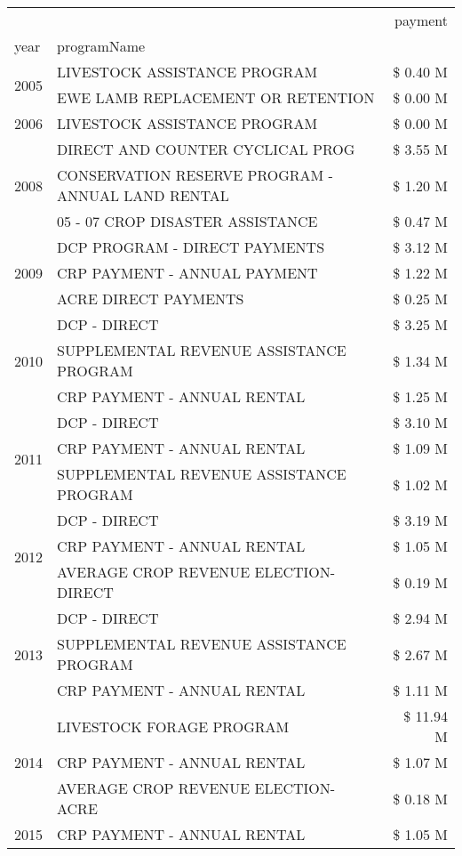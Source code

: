 \begin{tabular}{llr}
\toprule
 &  & payment \\
year & programName &  \\
\midrule
\multirow[t]{2}{*}{2005} & LIVESTOCK ASSISTANCE PROGRAM & \$ 0.40 M \\
 & EWE LAMB REPLACEMENT OR RETENTION & \$ 0.00 M \\
\cline{1-3}
2006 & LIVESTOCK ASSISTANCE PROGRAM & \$ 0.00 M \\
\cline{1-3}
\multirow[t]{3}{*}{2008} & DIRECT AND COUNTER CYCLICAL PROG & \$ 3.55 M \\
 & CONSERVATION RESERVE PROGRAM - ANNUAL LAND RENTAL & \$ 1.20 M \\
 & 05 - 07 CROP DISASTER ASSISTANCE & \$ 0.47 M \\
\cline{1-3}
\multirow[t]{3}{*}{2009} & DCP PROGRAM - DIRECT PAYMENTS & \$ 3.12 M \\
 & CRP PAYMENT - ANNUAL PAYMENT & \$ 1.22 M \\
 & ACRE DIRECT PAYMENTS & \$ 0.25 M \\
\cline{1-3}
\multirow[t]{3}{*}{2010} & DCP - DIRECT & \$ 3.25 M \\
 & SUPPLEMENTAL REVENUE ASSISTANCE PROGRAM & \$ 1.34 M \\
 & CRP PAYMENT - ANNUAL RENTAL & \$ 1.25 M \\
\cline{1-3}
\multirow[t]{3}{*}{2011} & DCP - DIRECT & \$ 3.10 M \\
 & CRP PAYMENT - ANNUAL RENTAL & \$ 1.09 M \\
 & SUPPLEMENTAL REVENUE ASSISTANCE PROGRAM & \$ 1.02 M \\
\cline{1-3}
\multirow[t]{3}{*}{2012} & DCP - DIRECT & \$ 3.19 M \\
 & CRP PAYMENT - ANNUAL RENTAL & \$ 1.05 M \\
 & AVERAGE CROP REVENUE ELECTION-DIRECT & \$ 0.19 M \\
\cline{1-3}
\multirow[t]{3}{*}{2013} & DCP - DIRECT & \$ 2.94 M \\
 & SUPPLEMENTAL REVENUE ASSISTANCE PROGRAM & \$ 2.67 M \\
 & CRP PAYMENT - ANNUAL RENTAL & \$ 1.11 M \\
\cline{1-3}
\multirow[t]{3}{*}{2014} & LIVESTOCK FORAGE PROGRAM & \$ 11.94 M \\
 & CRP PAYMENT - ANNUAL RENTAL & \$ 1.07 M \\
 & AVERAGE CROP REVENUE ELECTION-ACRE & \$ 0.18 M \\
\cline{1-3}
\multirow[t]{3}{*}{2015} & CRP PAYMENT - ANNUAL RENTAL & \$ 1.05 M \\

\end{tabular}
